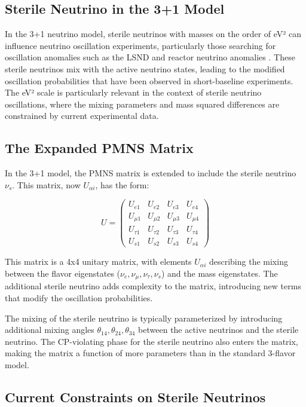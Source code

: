 \documentclass[a4paper,12pt,numbered]{article}
\begin{document}
\subsection{Sterile Neutrino in the 3+1 Model}

In the 3+1 neutrino model, sterile neutrinos with masses on the order of eV² can influence neutrino oscillation experiments, particularly those searching for oscillation anomalies such as the LSND and reactor neutrino anomalies \cite{LSND, MiniBooNE}. These sterile neutrinos mix with the active neutrino states, leading to the modified oscillation probabilities that have been observed in short-baseline experiments. The eV² scale is particularly relevant in the context of sterile neutrino oscillations, where the mixing parameters and mass squared differences are constrained by current experimental data.


\subsection{The Expanded PMNS Matrix}

In the 3+1 model, the PMNS matrix is extended to include the sterile neutrino \( \nu_s \). This matrix, now \( U_{\alpha i} \), has the form:

\[
U = \begin{pmatrix}
U_{e1} & U_{e2} & U_{e3} & U_{e4} \\
U_{\mu1} & U_{\mu2} & U_{\mu3} & U_{\mu4} \\
U_{\tau1} & U_{\tau2} & U_{\tau3} & U_{\tau4} \\
U_{s1} & U_{s2} & U_{s3} & U_{s4}
\end{pmatrix}
\]

This matrix is a 4x4 unitary matrix, with elements \( U_{\alpha i} \) describing the mixing between the flavor eigenstates (\( \nu_e, \nu_\mu, \nu_\tau, \nu_s \)) and the mass eigenstates. The additional sterile neutrino adds complexity to the matrix, introducing new terms that modify the oscillation probabilities.

The mixing of the sterile neutrino is typically parameterized by introducing additional mixing angles \( \theta_{14}, \theta_{24}, \theta_{34} \) between the active neutrinos and the sterile neutrino. The CP-violating phase for the sterile neutrino also enters the matrix, making the matrix a function of more parameters than in the standard 3-flavor model.

\subsection{Current Constraints on Sterile Neutrinos}
\end{document}
